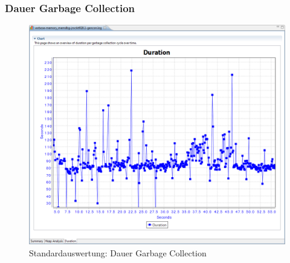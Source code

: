\subsubsection*{Dauer Garbage Collection}
 \begin{figure}[H]
  	\centering
    	\includegraphics[width=15cm]{images/tutorial_standardreport_duration}
        	\caption{Standardauswertung: Dauer Garbage Collection}
\end{figure}



